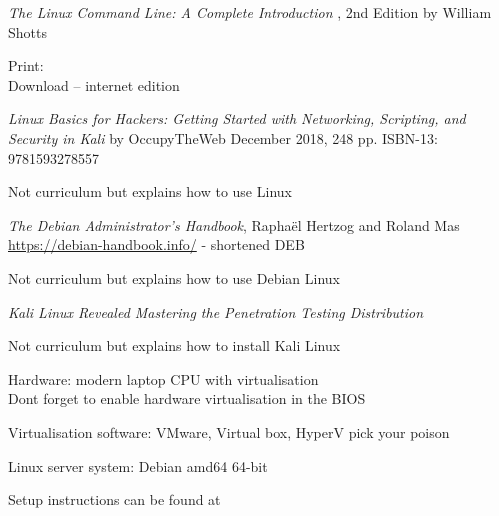 \documentclass[Screen16to9,17pt]{foils}
\begin{document}

\emph{The Linux Command Line: A Complete Introduction }, 2nd Edition
by William Shotts

Print: \\
Download -- internet edition 




\emph{Linux Basics for Hackers:
Getting Started with Networking, Scripting, and Security in Kali}
by OccupyTheWeb
December 2018, 248 pp.
ISBN-13:
9781593278557

Not curriculum but explains how to use Linux



\emph{The Debian Administrator’s Handbook}, Raphaël Hertzog and Roland Mas\\
\url{https://debian-handbook.info/} - shortened DEB

Not curriculum but explains how to use Debian Linux



\emph{Kali Linux Revealed  Mastering the Penetration Testing Distribution}

Not curriculum but explains how to install Kali Linux






\begin{list2}
\item Hardware: modern laptop CPU with virtualisation\\
Dont forget to enable hardware virtualisation in the BIOS
\item Virtualisation software: VMware, Virtual box, HyperV pick your poison
\item Linux server system: Debian amd64 64-bit 
\item Setup instructions can be found at 
\end{list2}
\end{document}

